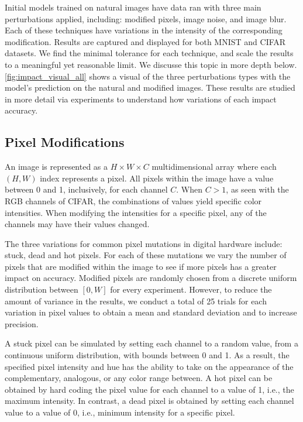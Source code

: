 \documentclass[conference]{IEEEtran}
\begin{document}
Initial models trained on natural images have data ran with three main perturbations applied, including: modified pixels, image noise, and image blur. Each of these techniques have variations in the intensity of the corresponding modification. Results are captured and displayed for both MNIST and CIFAR datasets. We find the minimal tolerance for each technique, and scale the results to a meaningful yet reasonable limit. We discusse this topic in more depth below. \autoref{fig:impact_visual_all} shows a visual of the three perturbations types with the model's prediction on the natural and modified images. These results are studied in more detail via experiments to understand how variations of each impact accuracy.

\subsection{Pixel Modifications}

An image is represented as a $H \times W \times C $ multidimensional array where each $(H, W)$ index represents a pixel. All pixels within the image have a value between 0 and 1, inclusively, for each channel $C$. When $C > 1$, as seen with the RGB channels of CIFAR, the combinations of values yield specific color intensities. When modifying the intensities for a specific pixel, any of the channels may have their values changed.

The three variations for common pixel mutations in digital hardware include: stuck, dead and hot pixels. For each of these mutations we vary the number of pixels that are modified within the image to see if more pixels has a greater impact on accuracy. Modified pixels are randomly chosen from a discrete uniform distribution between $[0, W]$ for every experiment. However, to reduce the amount of variance in the results, we conduct a total of 25 trials for each variation in pixel values to obtain a mean and standard deviation and to increase precision. 

A stuck pixel can be simulated by setting each channel to a random value, from a continuous uniform distribution, with bounds between 0 and 1. As a result, the specified pixel intensity and hue has the ability to take on the appearance of the complementary, analogous, or any color range between. A hot pixel can be obtained by hard coding the pixel value for each channel to a value of 1, i.e., the maximum intensity. In contrast, a dead pixel is obtained by setting each channel value to a value of 0, i.e., minimum intensity for a specific pixel. 
\end{document}
